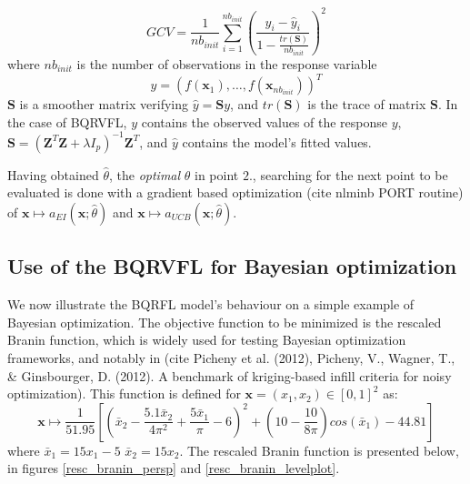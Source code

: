 \begin{equation}
GCV = \frac{1}{nb_{init}}\sum_{i = 1}^{nb_{init}} \left( \frac{y_i - \hat{y}_i}{1 - \frac{tr(\textbf{S})}{nb_{init}}} \right)^2 
\end{equation}
where $nb_{init}$ is the number of observations in the response variable 
$$
y = \left( f(\textbf{x}_1), \ldots, f(\textbf{x}_{nb_{init}}) \right)^T
$$
$\textbf{S}$ is a smoother matrix verifying $\hat{y} = \textbf{S}y$, and $tr(\textbf{S})$ is the trace of matrix $\textbf{S}$. In the case of BQRVFL, $y$ contains the observed values of the response $y$, $\textbf{S} = \left(\textbf{Z}^T\textbf{Z} + \lambda I_p \right)^{-1}\textbf{Z}^T$, and $\hat{y}$ contains the model's fitted values. 

Having obtained $\hat{\theta}$, the \textit{optimal} $\theta$ in point $2.$, searching for the next point to be evaluated is done with a gradient based optimization (cite nlminb PORT routine) of $\textbf{x} \mapsto a_{EI}\left(\textbf{x}; \hat{\theta} \right)$ and $\textbf{x} \mapsto a_{UCB}\left(\textbf{x}; \hat{\theta}  \right)$. 

\subsection{Use of the BQRVFL for Bayesian optimization}

We now illustrate the BQRFL model's behaviour on a simple example of Bayesian optimization. The objective function to be minimized is the rescaled Branin function, which is widely used for testing Bayesian optimization frameworks, and notably in (cite Picheny et al. (2012), Picheny, V., Wagner, T., \& Ginsbourger, D. (2012). A benchmark of kriging-based infill criteria for noisy optimization). 
This function is defined for $\textbf{x} = (x_1, x_2) \in [0, 1]^2$ as: 
\begin{equation}
\textbf{x} \mapsto \frac{1}{51.95}\left[\left(\bar{x}_2 - \frac{5.1\bar{x}_2}{4 \pi^2} + \frac{5\bar{x}_1}{\pi}-6\right)^2  + \left(10 - \frac{10}{8\pi}\right)cos(\bar{x}_1) - 44.81 \right]
\end{equation}
where $\bar{x}_1 = 15 x_1 - 5$ $\bar{x}_2 = 15 x_2$. The rescaled Branin function is presented below, in figures \ref{resc_branin_persp} and \ref{resc_branin_levelplot}. 

